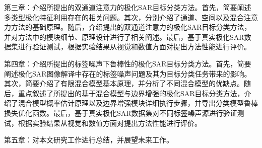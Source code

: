 第三章：介绍所提出的双通道注意力的极化SAR目标分类方法。首先，简要阐述多类型极化特征利用存在的相关问题。其次，分别介绍了通道、空间以及混合注意力方法的基础原理。随后，介绍提出的双通道注意力的极化SAR目标分类方法，并对方法中的模块细节、原理设计进行了相关阐述。最后，基于真实极化SAR数据集进行验证测试，根据实验结果从视觉和数值方面对提出方法性能进行评价。


第四章：介绍所提出的标签噪声下鲁棒性的极化SAR目标分类方法。首先，简要阐述极化SAR图像解译中存在的标签噪声问题及其为目标分类任务带来的影响。其次，简要介绍了有限混合模型基本原理，并分析了不同混合模型的优缺点。随后，重点叙述了所提出的基于混合模型与边界增强的极化SAR目标分类方法，介绍了混合模型概率估计原理以及边界增强模块详细执行步骤，并导出分类模型鲁棒损失优化函数。最后，基于真实极化SAR数据集对不同标签噪声源进行验证测试，根据实验结果从视觉和数值方面对提出方法性能进行评价。



第五章：对本文研究工作进行总结，并展望未来工作。